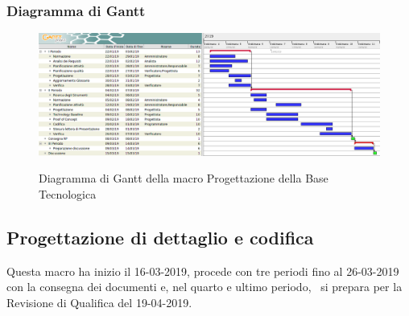         \begin{landscape}
			\subsubsection{Diagramma di Gantt}        
			\begin{figure}[H]
					\centering
					\includegraphics[scale=0.49]{img/Progettazione_della_base_tecnologica.png}\\
					\caption{Diagramma di Gantt della macro Progettazione della Base Tecnologica}
			\end{figure}
		\end{landscape}
		\newpage

        \subsection{Progettazione di dettaglio e codifica}
        Questa macro ha inizio il 16-03-2019, procede con tre periodi fino al 26-03-2019 con la consegna dei documenti e, nel
        quarto e ultimo periodo, \gruppo\ si prepara per la Revisione di Qualifica del 19-04-2019.
        
